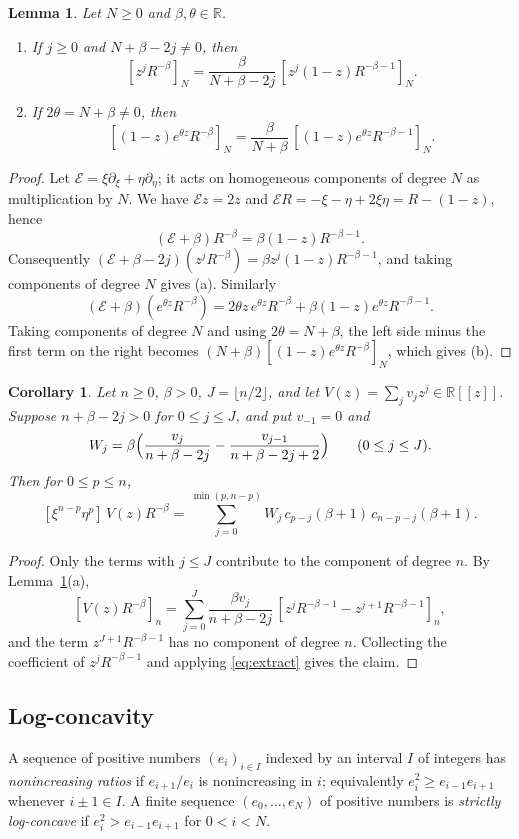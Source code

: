 \documentclass[11pt]{amsart}
\newtheorem{lemma}[theorem]{Lemma}
\newtheorem{corollary}[theorem]{Corollary}
\theoremstyle{definition}
\theoremstyle{remark}
\numberwithin{equation}{section}
\newcommand{\cE}{\mathcal{E}}
\begin{document}
\begin{lemma}\label{lem:euler}
Let $N\ge0$ and $\beta,\theta\in\mathbb{R}$.
\begin{enumerate}[label=\textup{(\alph*)}]
\item If $j\ge0$ and $N+\beta-2j\ne0$, then
\[
[z^jR^{-\beta}]_N=\frac{\beta}{N+\beta-2j}\,[z^j(1-z)R^{-\beta-1}]_N.
\]
\item If $2\theta=N+\beta\ne0$, then
\[
[(1-z)e^{\theta z}R^{-\beta}]_N=\frac{\beta}{N+\beta}\,[(1-z)e^{\theta z}R^{-\beta-1}]_N.
\]
\end{enumerate}
\end{lemma}

\begin{proof}
Let $\cE=\xi\partial_\xi+\eta\partial_\eta$; it acts on homogeneous components of degree $N$ as multiplication by $N$. We have $\cE z=2z$ and $\cE R=-\xi-\eta+2\xi\eta=R-(1-z)$, hence
\[
(\cE+\beta)R^{-\beta}=\beta(1-z)R^{-\beta-1}.
\]
Consequently $(\cE+\beta-2j)(z^jR^{-\beta})=\beta z^j(1-z)R^{-\beta-1}$, and taking components of degree $N$ gives (a). Similarly
\[
(\cE+\beta)(e^{\theta z}R^{-\beta})=2\theta z\,e^{\theta z}R^{-\beta}+\beta(1-z)e^{\theta z}R^{-\beta-1}.
\]
Taking components of degree $N$ and using $2\theta=N+\beta$, the left side minus the first term on the right becomes $(N+\beta)[(1-z)e^{\theta z}R^{-\beta}]_N$, which gives (b).
\end{proof}

\begin{corollary}\label{cor:raise}
Let $n\ge0$, $\beta>0$, $J=\lfloor n/2\rfloor$, and let $V(z)=\sum_jv_jz^j\in\mathbb{R}[[z]]$. Suppose $n+\beta-2j>0$ for $0\le j\le J$, and put $v_{-1}=0$ and
\[
W_j=\beta\Bigl(\frac{v_j}{n+\beta-2j}-\frac{v_{j-1}}{n+\beta-2j+2}\Bigr)\qquad(0\le j\le J).
\]
Then for $0\le p\le n$,
\[
[\xi^{n-p}\eta^p]\,V(z)R^{-\beta}=\sum_{j=0}^{\min(p,n-p)}W_j\,c_{p-j}(\beta+1)\,c_{n-p-j}(\beta+1).
\]
\end{corollary}

\begin{proof}
Only the terms with $j\le J$ contribute to the component of degree $n$. By Lemma~\ref{lem:euler}(a),
\[
[V(z)R^{-\beta}]_n=\sum_{j=0}^{J}\frac{\beta v_j}{n+\beta-2j}\,[z^jR^{-\beta-1}-z^{j+1}R^{-\beta-1}]_n,
\]
and the term $z^{J+1}R^{-\beta-1}$ has no component of degree $n$. Collecting the coefficient of $z^jR^{-\beta-1}$ and applying \eqref{eq:extract} gives the claim.
\end{proof}

\subsection{Log-concavity}
A sequence of positive numbers $(e_i)_{i\in I}$ indexed by an interval $I$ of integers has \emph{nonincreasing ratios} if $e_{i+1}/e_i$ is nonincreasing in $i$; equivalently $e_i^2\ge e_{i-1}e_{i+1}$ whenever $i\pm1\in I$. A finite sequence $(e_0,\dots,e_N)$ of positive numbers is \emph{strictly log-concave} if $e_i^2>e_{i-1}e_{i+1}$ for $0<i<N$.
\end{document}
